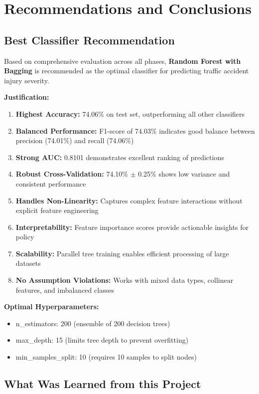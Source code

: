 \documentclass[stu,12pt,floatsintext]{apa7}
\begin{document}
\section{Recommendations and Conclusions}

\subsection{Best Classifier Recommendation}

Based on comprehensive evaluation across all phases, \textbf{Random Forest with Bagging} is recommended as the optimal classifier for predicting traffic accident injury severity.

\textbf{Justification:}
\begin{enumerate}
    \item \textbf{Highest Accuracy:} 74.06\% on test set, outperforming all other classifiers
    \item \textbf{Balanced Performance:} F1-score of 74.03\% indicates good balance between precision (74.01\%) and recall (74.06\%)
    \item \textbf{Strong AUC:} 0.8101 demonstrates excellent ranking of predictions
    \item \textbf{Robust Cross-Validation:} 74.10\% $\pm$ 0.25\% shows low variance and consistent performance
    \item \textbf{Handles Non-Linearity:} Captures complex feature interactions without explicit feature engineering
    \item \textbf{Interpretability:} Feature importance scores provide actionable insights for policy
    \item \textbf{Scalability:} Parallel tree training enables efficient processing of large datasets
    \item \textbf{No Assumption Violations:} Works with mixed data types, collinear features, and imbalanced classes
\end{enumerate}

\textbf{Optimal Hyperparameters:}
\begin{itemize}
    \item n\_estimators: 200 (ensemble of 200 decision trees)
    \item max\_depth: 15 (limits tree depth to prevent overfitting)
    \item min\_samples\_split: 10 (requires 10 samples to split nodes)
\end{itemize}

\subsection{What Was Learned from this Project}
\end{document}
